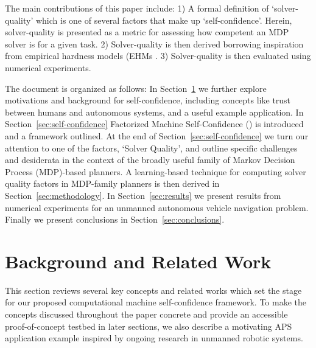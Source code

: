 The main contributions of this paper include: 1) A formal definition of `solver-quality' which is one of several factors that make up `self-confidence'. Herein, solver-quality is presented as a metric for assessing how competent an MDP solver is for a given task. 2) Solver-quality is then derived borrowing inspiration from empirical hardness models (EHMs \cite{Leyton-Brown2009-yr}. 3) Solver-quality is then evaluated using numerical experiments.

The document is organized as follows: In Section~\ref{sec:background} we further explore motivations and background for self-confidence, including concepts like trust between humans and autonomous systems, and a useful example application. In Section~\ref{sec:self-confidence} Factorized Machine Self-Confidence (\famsec) is introduced and a framework outlined. At the end of Section~\ref{sec:self-confidence} we turn our attention to one of the \famsec{} factors, `Solver Quality', and outline specific challenges and desiderata in the context of the broadly useful family of Markov Decision Process (MDP)-based planners. A learning-based technique for computing solver quality factors in MDP-family planners is then derived in Section~\ref{sec:methodology}. In Section~\ref{sec:results} we present results from numerical experiments for an unmanned autonomous vehicle navigation problem. Finally we present conclusions in Section~\ref{sec:conclusions}.

\section{Background and Related Work} \label{sec:background}
This section reviews several key concepts and related works which set the stage for our proposed computational machine self-confidence framework. To make the concepts discussed throughout the paper concrete and provide an accessible proof-of-concept testbed in later sections, we also describe a motivating APS application example inspired by ongoing research in unmanned robotic systems.  

